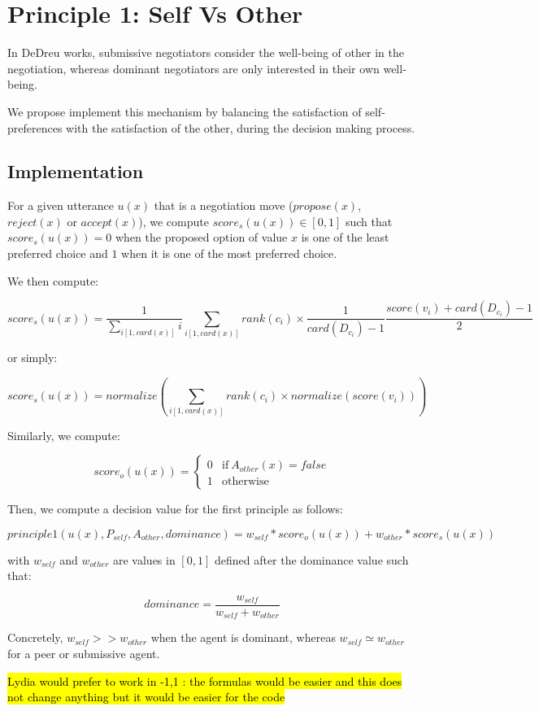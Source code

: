 \documentclass{article}
\begin{document}
\section{Principle 1: Self Vs Other}
In DeDreu works, submissive negotiators consider the well-being of other in the negotiation, whereas dominant negotiators are only interested in their own well-being. 

We propose implement this mechanism by balancing the satisfaction of self-preferences with the satisfaction of the other, during the decision making process.

\subsection{Implementation}
For a given utterance $u(x)$ that is a negotiation move ($propose(x)$, $reject(x)$ or $accept(x)$), we compute $score_s(u(x))\in[0,1]$ such that $score_s(u(x))=0$ when the proposed option of value $x$ is one of the least preferred choice and $1$ when it is one of the most preferred choice.

We then compute: 

$$score_s(u(x)) = \frac{1}{\sum_{i[1,card(x)]} i} \sum_{i[1,card(x)]} rank(c_i)\times \frac{1}{card(D_{c_i})-1} \frac{score(v_i)+card(D_{c_i})-1}{2} $$

or simply:

$$score_s(u(x)) = normalize \left( \sum_{i[1,card(x)]} rank(c_i)\times normalize ( score(v_i) ) \right) $$


Similarly, we compute:

$$score_o(u(x)) = \left\{\begin{array}{ll}
0 & \mathrm{if\ }A_{other}(x)= false\\
1 & \mathrm{otherwise}
\end{array}\right.$$

Then, we compute a decision value for the first principle as follows:

$$principle1(u(x),P_{self},A_{other},dominance) = w_{self} * score_o(u(x)) + w_{other} * score_s(u(x))$$

with $w_{self}$ and $w_{other}$ are values in $[0,1]$ defined after the dominance value such that:

$$dominance = \frac{w_{self}}{w_{self}+w_{other}}$$

Concretely, $w_{self}>>w_{other}$ when the agent is dominant, whereas $w_{self}\simeq w_{other}$ for a peer or submissive agent.


\hl{Lydia would prefer to work in -1,1 : the formulas would be easier and this does not change anything but it would be easier for the code}
\end{document}
